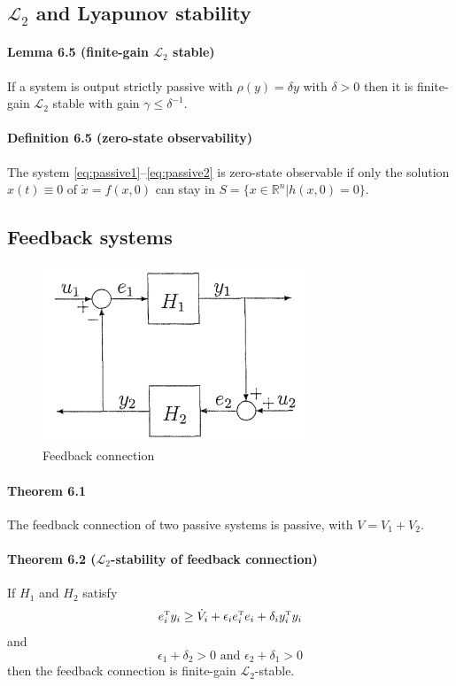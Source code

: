 \subsection[\texorpdfstring{$\mathcal{L}_2$ and Lyapunov stability}
	{L2 and Lyapunov stability}]
	{$\mathcal{L}_2$ and Lyapunov stability}
\paragraph{Lemma 6.5 (finite-gain $\mathcal{L}_2$ stable)}
If a system is output strictly passive with $\rho(y) = \delta y$ with $\delta > 0$ then it is finite-gain $\mathcal{L}_2$ stable with gain $\gamma \leq \delta^{-1}$.

\paragraph{Definition 6.5 (zero-state observability)}
The system \eqref{eq:passive1}--\eqref{eq:passive2} is zero-state observable if only the solution $x(t) \equiv 0$ of $\dot{x} = f(x,0)$ can stay in $S = \{ x \in \mathbb{R}^n | h(x,0) = 0 \}$.

\subsection{Feedback systems}
\begin{figure}[htbp]
	\centering
	\includegraphics[width=8cm]{feedback-connection.png}
	\caption{Feedback connection}
\end{figure}

\paragraph{Theorem 6.1}
The feedback connection of two passive systems is passive, with $V = V_1 + V_2$.

\paragraph{Theorem 6.2 ($\mathcal{L}_2$-stability of feedback connection)}
If $H_1$ and $H_2$ satisfy
\begin{equation}
	e_i^{\scriptscriptstyle \mathrm{T}} y_i \geq \dot{V}_i + \epsilon_i e_i^{\scriptscriptstyle \mathrm{T}} e_i + \delta_i y_i^{\scriptscriptstyle \mathrm{T}} y_i
\end{equation}
and
\begin{equation}
	\epsilon_1 + \delta_2 > 0 \mbox{ and } \epsilon_2 + \delta_1 > 0
\end{equation}
then the feedback connection is finite-gain $\mathcal{L}_2$-stable.